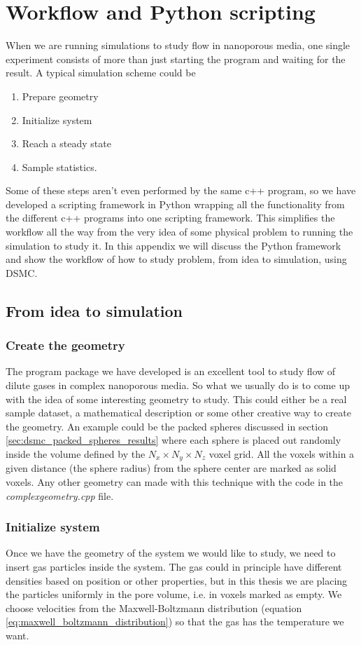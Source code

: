 \chapter{Workflow and Python scripting}
When we are running simulations to study flow in nanoporous media, one single experiment consists of more than just starting the program and waiting for the result. A typical simulation scheme could be
\begin{enumerate}
	\item Prepare geometry
	\item Initialize system
	\item Reach a steady state
	\item Sample statistics.
\end{enumerate}
Some of these steps aren't even performed by the same c++ program, so we have developed a scripting framework in Python wrapping all the functionality from the different c++ programs into one scripting framework. This simplifies the workflow all the way from the very idea of some physical problem to running the simulation to study it. In this appendix we will discuss the Python framework and show the workflow of how to study problem, from idea to simulation, using DSMC.
\section{From idea to simulation}
\subsection{Create the geometry}
The program package we have developed is an excellent tool to study flow of dilute gases in complex nanoporous media. So what we usually do is to come up with the idea of some interesting geometry to study. This could either be a real sample dataset, a mathematical description or some other creative way to create the geometry. An example could be the packed spheres discussed in section \ref{sec:dsmc_packed_spheres_results} where each sphere is placed out randomly inside the volume defined by the $N_x\times N_y \times N_z$ voxel grid. All the voxels within a given distance (the sphere radius) from the sphere center are marked as solid voxels. Any other geometry can made with this technique with the code in the \textit{complexgeometry.cpp} file. 
\subsection{Initialize system}
Once we have the geometry of the system we would like to study, we need to insert gas particles inside the system. The gas could in principle have different densities based on position or other properties, but in this thesis we are placing the particles uniformly in the pore volume, i.e. in voxels marked as empty. We choose velocities from the Maxwell-Boltzmann distribution (equation \eqref{eq:maxwell_boltzmann_distribution}) so that the gas has the temperature we want.
